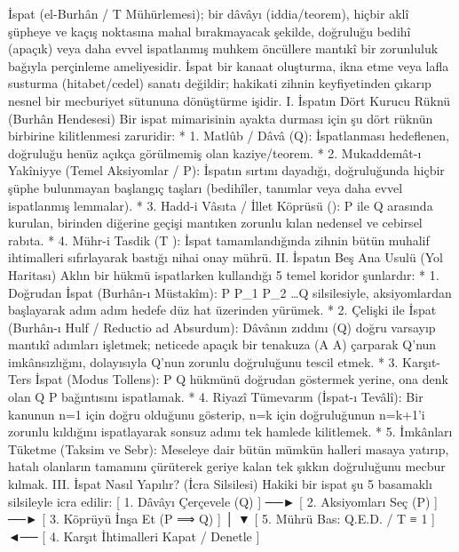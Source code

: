 \documentclass[11pt,a4paper]{article}
\begin{document}
İspat (el-Burhân / T  Mühürlemesi); bir dâvâyı (iddia/teorem), hiçbir aklî şüpheye ve kaçış noktasına mahal bırakmayacak şekilde, doğruluğu bedihî (apaçık) veya daha evvel ispatlanmış muhkem öncüllere mantıkî bir zorunluluk bağıyla perçinleme ameliyesidir.
İspat bir kanaat oluşturma, ikna etme veya lafla susturma (hitabet/cedel) sanatı değildir; hakikati zihnin keyfiyetinden çıkarıp nesnel bir mecburiyet sütununa dönüştürme işidir.
I. İspatın Dört Kurucu Rüknü (Burhân Hendesesi)
Bir ispat mimarisinin ayakta durması için şu dört rüknün birbirine kilitlenmesi zaruridir:
 * 1. Matlûb / Dâvâ (Q): İspatlanması hedeflenen, doğruluğu henüz açıkça görülmemiş olan kaziye/teorem.
 * 2. Mukaddemât-ı Yakîniyye (Temel Aksiyomlar / P): İspatın sırtını dayadığı, doğruluğunda hiçbir şüphe bulunmayan başlangıç taşları (bedihîler, tanımlar veya daha evvel ispatlanmış lemmalar).
 * 3. Hadd-i Vâsıta / İllet Köprüsü (): P ile Q arasında kurulan, birinden diğerine geçişi mantıken zorunlu kılan nedensel ve cebirsel rabıta.
 * 4. Mühr-i Tasdik (T ): İspat tamamlandığında zihnin bütün muhalif ihtimalleri sıfırlayarak bastığı nihai onay mührü.
II. İspatın Beş Ana Usulü (Yol Haritası)
Aklın bir hükmü ispatlarken kullandığı 5 temel koridor şunlardır:
 * 1. Doğrudan İspat (Burhân-ı Müstakîm):
   P \implies P_1 \implies P_2 \implies \dots \implies Q silsilesiyle, aksiyomlardan başlayarak adım adım hedefe düz hat üzerinden yürümek.
 * 2. Çelişki ile İspat (Burhân-ı Hulf / Reductio ad Absurdum):
   Dâvânın zıddını (\neg Q) doğru varsayıp mantıkî adımları işletmek; neticede apaçık bir tenakuza (A \wedge \neg A) çarparak \neg Q'nun imkânsızlığını, dolayısıyla Q'nun zorunlu doğruluğunu tescil etmek.
 * 3. Karşıt-Ters İspat (Modus Tollens):
   P \implies Q hükmünü doğrudan göstermek yerine, ona denk olan \neg Q \implies \neg P bağıntısını ispatlamak.
 * 4. Riyazî Tümevarım (İspat-ı Tevâlî):
   Bir kanunun n=1 için doğru olduğunu gösterip, n=k için doğruluğunun n=k+1'i zorunlu kıldığını ispatlayarak sonsuz adımı tek hamlede kilitlemek.
 * 5. İmkânları Tüketme (Taksim ve Sebr):
   Meseleye dair bütün mümkün halleri masaya yatırıp, hatalı olanların tamamını çürüterek geriye kalan tek şıkkın doğruluğunu mecbur kılmak.
III. İspat Nasıl Yapılır? (İcra Silsilesi)
Hakiki bir ispat şu 5 basamaklı silsileyle icra edilir:
[ 1. Dâvâyı Çerçevele (Q) ] ──► [ 2. Aksiyomları Seç (P) ] ──► [ 3. Köprüyü İnşa Et (P ⟹ Q) ]
                                                                             │
                                                                             ▼
[ 5. Mührü Bas: Q.E.D. / T ≡ 1 ] ◄── [ 4. Karşıt İhtimalleri Kapat / Denetle ]
\end{document}
